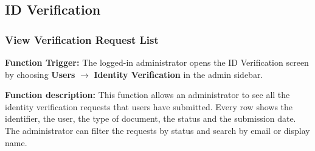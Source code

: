 

\subsection{ID Verification}

\subsubsection{View Verification Request List}

\textbf{Function Trigger:} The logged-in administrator opens the ID Verification screen by choosing \textbf{Users} $\rightarrow$ \textbf{Identity Verification} in the admin sidebar.

\textbf{Function description:} This function allows an administrator to see all the identity verification requests that users have submitted. Every row shows the identifier, the user, the type of document, the status and the submission date. The administrator can filter the requests by status and search by email or display name.

